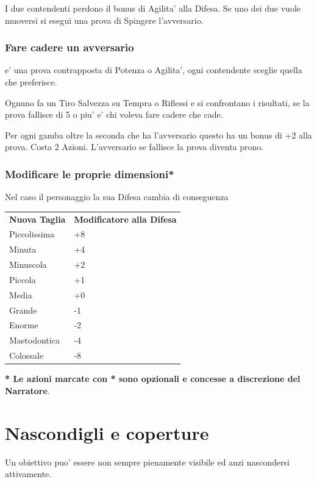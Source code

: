 \documentclass[a4paper,11pt,twoside,openany]{book}
\begin{document}
I due contendenti perdono il bonus di Agilita' alla Difesa. Se uno dei due vuole muoversi si esegui una prova di Spingere l'avversario.

\subsubsection{Fare cadere un avversario} e' una prova contrapposta di Potenza o Agilita', ogni contendente sceglie quella che preferisce. 

Ognuno fa un Tiro Salvezza su Tempra o Riflessi e si confrontano i risultati, se la prova fallisce di 5 o piu' e' chi voleva fare cadere che cade.

Per ogni gamba oltre la seconda che ha l'avversario questo ha un bonus di +2 alla prova. Costa 2 Azioni. L'avversario se fallisce la prova diventa prono.

\subsubsection{Modificare le proprie dimensioni*}

Nel caso il personaggio  la sua Difesa cambia di conseguenza

\bigskip

\begin{tabular}{ll}
\toprule
\textbf{Nuova Taglia} & \textbf{Modificatore alla Difesa}\tabularnewline
Piccolissima & +8\tabularnewline
Minuta & +4\tabularnewline
Minuscola & +2\tabularnewline
Piccola & +1\tabularnewline
Media & +0\tabularnewline
Grande & -1\tabularnewline
Enorme & -2\tabularnewline
Mastodontica & -4\tabularnewline
Colossale & -8\tabularnewline

\end{tabular}

\bigskip

\textbf{{*} Le azioni marcate con {*} sono opzionali e concesse a
discrezione del Narratore}.

\pagebreak

\section{Nascondigli e coperture}

\label{nascondigli-e-coperture}
Un obiettivo puo' essere non sempre pienamente visibile ed anzi nascondersi
attivamente.
\end{document}
